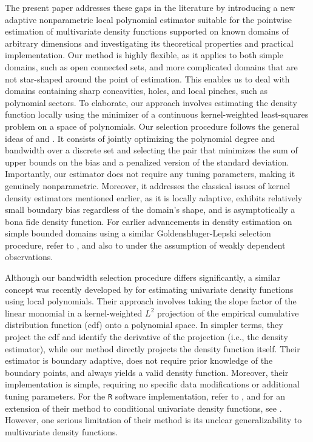 \documentclass[bj,authoryear]{imsart}
\numberwithin{equation}{section}
\theoremstyle{plain}
\theoremstyle{remark}
\newcommand{\1}{\mathds{1}}
\begin{document}
    The present paper addresses these gaps in the literature by introducing a new adaptive nonparametric local polynomial estimator suitable for the pointwise estimation of multivariate density functions supported on known domains of arbitrary dimensions and investigating its theoretical properties and practical implementation. Our method is highly flexible, as it applies to both simple domains, such as open connected sets, and more complicated domains that are not star-shaped around the point of estimation. This enables us to deal with domains containing sharp concavities, holes, and local pinches, such as polynomial sectors. To elaborate, our approach involves estimating the density function locally using the minimizer of a continuous kernel-weighted least-squares problem on a space of polynomials. Our selection procedure follows the general ideas of \cite{Lepski1991adaptive} and \cite{GoldenshlugerLepski2008,GoldenshlugerLepski2009,GoldenshlugerLepski2011,GoldenshlugerLepski2014}. It consists of jointly optimizing the polynomial degree and bandwidth over a discrete set and selecting the pair that minimizes the sum of upper bounds on the bias and a penalized version of the standard deviation. Importantly, our estimator does not require any tuning parameters, making it genuinely nonparametric. Moreover, it addresses the classical issues of kernel density estimators mentioned earlier, as it is locally adaptive, exhibits relatively small boundary bias regardless of the domain's shape, and is asymptotically a bona fide density function. For earlier advancements in density estimation on simple bounded domains using a similar Goldenshluger-Lepski selection procedure, refer to \cite{BertinKlutchnikoff2014,BertinElKoleiKlutchnikoff2019}, and also to \cite{BertinKlutchnikoff2017,Bertin_et_al2020} under the assumption of weakly dependent observations.

    Although our bandwidth selection procedure differs significantly, a similar concept was recently developed by \cite{CattaneoJanssonMa2020JASA} for estimating univariate density functions using local polynomials. Their approach involves taking the slope factor of the linear monomial in a kernel-weighted $L^2$ projection of the empirical cumulative distribution function (cdf) onto a polynomial space. In simpler terms, they project the cdf and identify the derivative of the projection (i.e., the density estimator), while our method directly projects the density function itself. Their estimator is boundary adaptive, does not require prior knowledge of the boundary points, and always yields a valid density function. Moreover, their implementation is simple, requiring no specific data modifications or additional tuning parameters. For the \texttt{R} software implementation, refer to \cite{CattaneoJanssonMa2022JSS}, and for an extension of their method to conditional univariate density functions, see \cite{CattaneoChandakJanssonMa2024}. However, one serious limitation of their method is its unclear generalizability to multivariate density functions.
\end{document}
